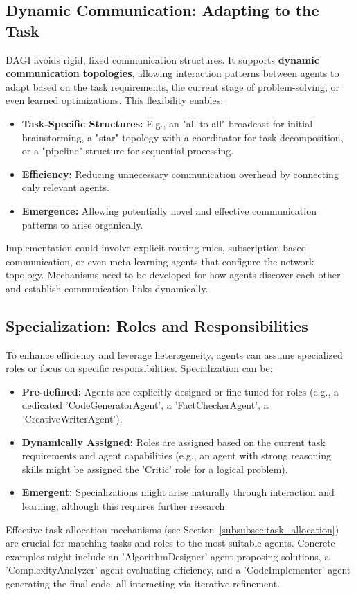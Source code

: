 \documentclass[12pt]{amsart}
\begin{document}
\subsection{Dynamic Communication: Adapting to the Task}
DAGI avoids rigid, fixed communication structures. It supports \textbf{dynamic communication topologies}, allowing interaction patterns between agents to adapt based on the task requirements, the current stage of problem-solving, or even learned optimizations. This flexibility enables:
\begin{itemize}[leftmargin=*]
    \item \textbf{Task-Specific Structures:} E.g., an "all-to-all" broadcast for initial brainstorming, a "star" topology with a coordinator for task decomposition, or a "pipeline" structure for sequential processing.
    \item \textbf{Efficiency:} Reducing unnecessary communication overhead by connecting only relevant agents.
    \item \textbf{Emergence:} Allowing potentially novel and effective communication patterns to arise organically.
\end{itemize}
Implementation could involve explicit routing rules, subscription-based communication, or even meta-learning agents that configure the network topology. Mechanisms need to be developed for how agents discover each other and establish communication links dynamically.

\subsection{Specialization: Roles and Responsibilities}
To enhance efficiency and leverage heterogeneity, agents can assume specialized roles or focus on specific responsibilities. Specialization can be:
\begin{itemize}[leftmargin=*]
    \item \textbf{Pre-defined:} Agents are explicitly designed or fine-tuned for roles (e.g., a dedicated 'CodeGeneratorAgent', a 'FactCheckerAgent', a 'CreativeWriterAgent').
    \item \textbf{Dynamically Assigned:} Roles are assigned based on the current task requirements and agent capabilities (e.g., an agent with strong reasoning skills might be assigned the 'Critic' role for a logical problem).
    \item \textbf{Emergent:} Specializations might arise naturally through interaction and learning, although this requires further research.
\end{itemize}
Effective task allocation mechanisms (see Section~\ref{subsubsec:task_allocation}) are crucial for matching tasks and roles to the most suitable agents. Concrete examples might include an 'AlgorithmDesigner' agent proposing solutions, a 'ComplexityAnalyzer' agent evaluating efficiency, and a 'CodeImplementer' agent generating the final code, all interacting via iterative refinement.
\end{document}
